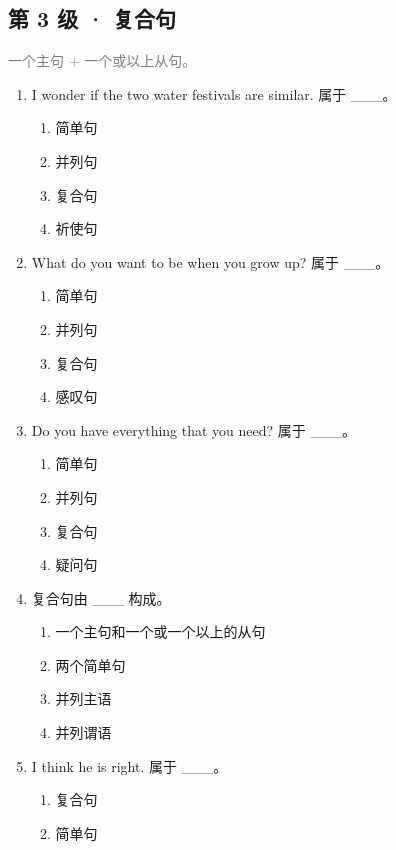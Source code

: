 \documentclass[11pt,a4paper]{ctexart}
\begin{document}
\subsection*{第 3 级 · 复合句}
\noindent\textcolor{gray}{一个主句 + 一个或以上从句。}\par\smallskip
\begin{enumerate}[leftmargin=*,itemsep=4pt]
\item I wonder if the two water festivals are similar. 属于 \_\_\_。
\begin{enumerate}[label=\Alph*.,leftmargin=2em,itemsep=1pt,topsep=2pt]
\item 简单句
\item 并列句
\item 复合句
\item 祈使句
\end{enumerate}
\item What do you want to be when you grow up? 属于 \_\_\_。
\begin{enumerate}[label=\Alph*.,leftmargin=2em,itemsep=1pt,topsep=2pt]
\item 简单句
\item 并列句
\item 复合句
\item 感叹句
\end{enumerate}
\item Do you have everything that you need? 属于 \_\_\_。
\begin{enumerate}[label=\Alph*.,leftmargin=2em,itemsep=1pt,topsep=2pt]
\item 简单句
\item 并列句
\item 复合句
\item 疑问句
\end{enumerate}
\item 复合句由 \_\_\_ 构成。
\begin{enumerate}[label=\Alph*.,leftmargin=2em,itemsep=1pt,topsep=2pt]
\item 一个主句和一个或一个以上的从句
\item 两个简单句
\item 并列主语
\item 并列谓语
\end{enumerate}
\item I think he is right. 属于 \_\_\_。
\begin{enumerate}[label=\Alph*.,leftmargin=2em,itemsep=1pt,topsep=2pt]
\item 复合句
\item 简单句

\end{enumerate}
\end{enumerate}
\end{document}
